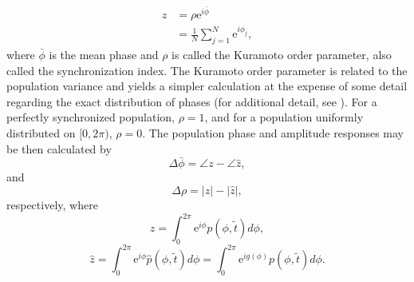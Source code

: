 \begin{equation}
    \begin{split}
    z &=\rho \mathrm{e}^{i\bar{\phi}}\\
      &= \frac{1}{N}\sum_{j=1}^N \mathrm{e}^{i\phi_{j}},
    \end{split}
\end{equation}
where $\bar{\phi}$ is the mean phase and $\rho$ is called the Kuramoto order parameter, 
also called the synchronization index.
The Kuramoto order parameter is related to the population variance and yields a simpler 
calculation at the expense of some detail regarding the exact distribution of phases
(for additional detail, see \cite{kuramoto1984}).
For a perfectly synchronized population, $\rho=1$, and for a population uniformly distributed on $[0,2\pi)$, $\rho=0$.
The population phase and amplitude responses may be then calculated by
\begin{equation}
    \Delta\bar{\phi} = \angle z - \angle\hat{z},
\end{equation}
and
\begin{equation}
    \Delta\rho = |z| - |\hat{z}|,
\end{equation}
respectively, where
\begin{equation}
    z = \int_0^{2\pi} \mathrm{e}^{i\phi}p(\phi,\tilde{t})d\phi,
\end{equation}
\begin{equation}\label{eq:zhat}
    \hat{z} = \int_0^{2\pi} \mathrm{e}^{i\phi}\hat{p}(\phi,\tilde{t})d\phi = \int_0^{2\pi} \mathrm{e}^{ig(\phi)}p(\phi,\tilde{t})d\phi.
\end{equation}


